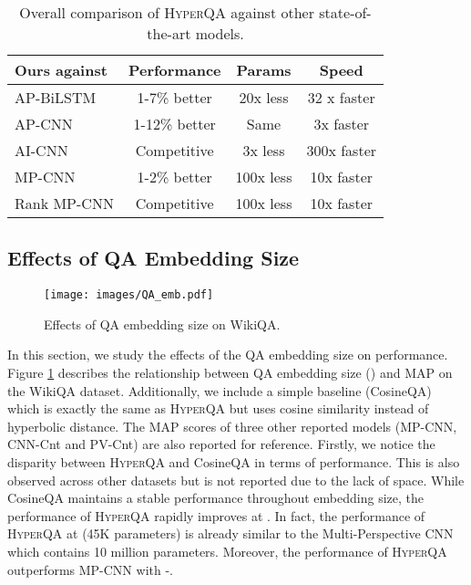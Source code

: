 \documentclass[sigconf]{acmart}
\begin{document}
\begin{table}[htbp]
  \centering
\small
    \begin{tabular}{lccc}
    \hline
    Ours against & Performance & Params & Speed \\
    \hline
    AP-BiLSTM & 1-7\% better & 20x less & 32 x faster \\
    AP-CNN & 1-12\% better & Same  & 3x faster \\
    AI-CNN & Competitive & 3x less & 300x faster \\
    MP-CNN & 1-2\% better & 100x less & 10x faster \\
    Rank MP-CNN & Competitive & 100x less & 10x faster \\
    \hline
    \end{tabular}\caption{Overall comparison of \textsc{HyperQA} against other state-of-the-art models.}
  \label{tab:addlabel}\end{table}


\subsection{Effects of QA Embedding Size}
\begin{figure}[H] 
\begin{center}
\texttt{[image: images/QA\_emb.pdf]}
\caption{Effects of QA embedding size on WikiQA.}
\label{emb_size}
\end{center}
\end{figure}
\vspace{-1em}

In this section, we study the effects of the QA embedding size on performance. Figure \ref{emb_size} describes the relationship between QA embedding size () and MAP on the WikiQA dataset. Additionally, we include a simple baseline (CosineQA) which is exactly the same as \textsc{HyperQA} but uses cosine similarity instead of hyperbolic distance. The MAP scores of three other reported models (MP-CNN, CNN-Cnt and PV-Cnt) are also reported for reference. Firstly, we notice the disparity between \textsc{HyperQA} and CosineQA in terms of performance. This is also observed across other datasets but is not reported due to the lack of space. While CosineQA maintains a stable performance throughout embedding size, the performance of \textsc{HyperQA} rapidly improves at . In fact, the performance of \textsc{HyperQA} at  (45K parameters) is already similar to the Multi-Perspective CNN \cite{DBLP:conf/emnlp/HeGL15} which contains 10 million parameters. Moreover, the performance of \textsc{HyperQA} outperforms MP-CNN with -.
\end{document}
